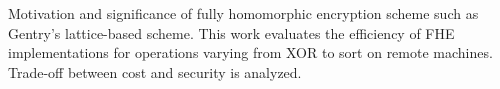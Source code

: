 \documentclass{acm_proc_article-sp}
\begin{document}
Motivation and significance of fully homomorphic encryption scheme such as Gentry's lattice-based scheme.  
This work evaluates the efficiency of FHE implementations for operations varying from XOR to sort on remote machines. Trade-off between cost and security is analyzed. \\\\\\\\\\\\\\\\\\\\\\\\\\\\\\\\\\\\\\\\\\\\\\\\\\\\\\\\\\\\\\\\\\\\\\\\\\\\\\\\\\\\\\\\\\\\\\\\\\\\\\\\\\\\\\\\\\\\\\\\\\\\\\\\\\\\\\\\\
\end{document}

